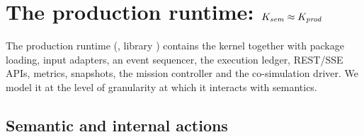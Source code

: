\section{The production runtime: $K_{\mathit{sem}}\approx K_{\mathit{prod}}$}\label{sec:prod}

The production runtime (, library ) contains
the kernel together with package loading, input adapters, an event sequencer,
the execution ledger, REST/SSE APIs, metrics, snapshots, the mission
controller and the co-simulation driver. We model it at the level of
granularity at which it interacts with semantics.

\subsection{Semantic and internal actions}

